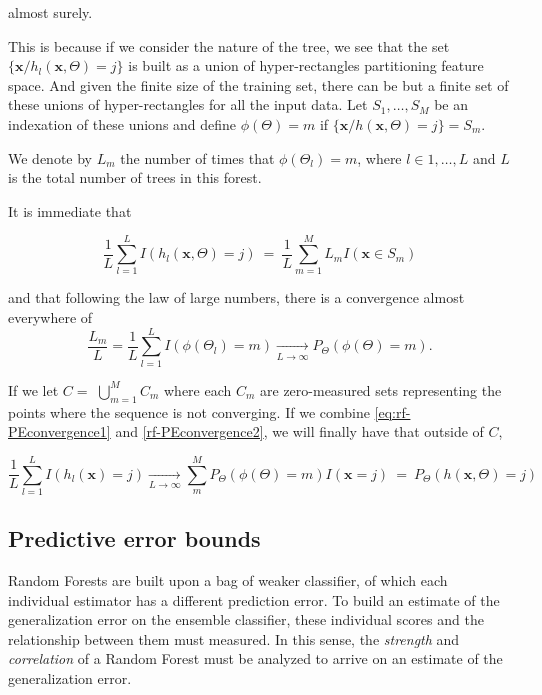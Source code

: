 almost surely.

This is because if we consider the nature of the tree, we see that the set $\{\textbf{x} / h_l(\textbf{x}, \Theta) = j \}$ is built as a union of hyper-rectangles partitioning feature space. And given the finite size of the training set, there can be but a finite set of these unions of hyper-rectangles for all the input data. Let $S_1, \ldots, S_M$ be an indexation of these unions and define $\phi(\Theta) = m $ if $\{\textbf{x} / h(\textbf{x}, \Theta) = j \} = S_m$.

We denote by $L_m$ the number of times that $\phi(\Theta_l) =m $, where $l \in {1,\ldots,L}$ and $L$ is the total number of trees in this forest.

It is immediate that

\begin{equation}
\frac{1}{L} \sum_{l=1}^L I(h_l(\textbf{x},\Theta) = j) \ = \ \frac{1}{L} \sum_{m=1}^M L_m I(\textbf{x} \in S_m)
\end{equation}\label{eq:rf-PEconvergence1}

and that following the law of large numbers, there is a convergence almost everywhere of
\begin{equation}\label{rf-PEconvergence2}
\frac{L_m}{L} = \frac{1}{L} \sum_{l=1}^L I(\phi(\Theta_l) = m) \xrightarrow[L \to \infty]{}  P_{\Theta}(\phi(\Theta)= m).
\end{equation}

If we let $C = $ $\bigcup\limits_{m=1}^{M} C_{m}$ where each $C_m$ are zero-measured sets representing the points where the sequence is not converging. If we combine \cref{eq:rf-PEconvergence1} and \cref{rf-PEconvergence2}, we will finally have that outside of $C$,

\begin{equation}
 \frac{1}{L} \sum_{l=1}^L I(h_l(\textbf{x}) = j) \xrightarrow[L \to \infty]{} \sum_m^M  P_{\Theta}(\phi(\Theta)= m) I(\textbf{x} =j ) \ = \ P_{\Theta}(h(\textbf{x}, \Theta) = j)
 \end{equation}



\subsection{Predictive error bounds}

Random Forests are built upon a bag of weaker classifier, of which each individual estimator has a different prediction error. To build an estimate of the generalization error on the ensemble classifier, these individual scores and the relationship between them must measured. In this sense, the \textit{strength} and \textit{correlation} of a Random Forest must be analyzed to arrive on an estimate of the generalization error.


